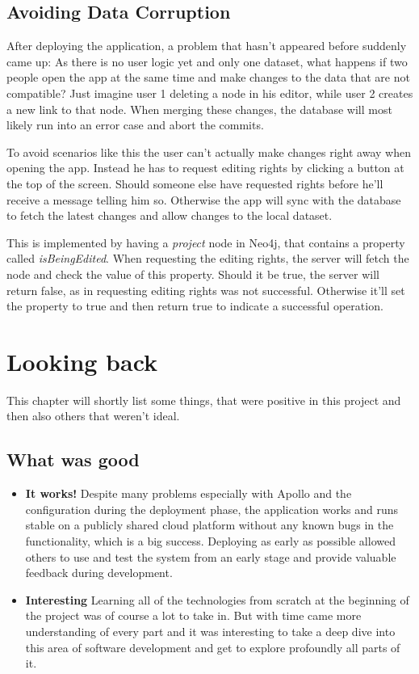 \newpage
\section{Avoiding Data Corruption}
After deploying the application, a problem that hasn't appeared before suddenly came up: As there is no user logic yet and only one dataset, what happens if two people open the app at the same time and make changes to the data that are not compatible? Just imagine user 1 deleting a node in his editor, while user 2 creates a new link to that node. When merging these changes, the database will most likely run into an error case and abort the commits.

To avoid scenarios like this the user can't actually make changes right away when opening the app. Instead he has to request editing rights by clicking a button at the top of the screen. Should someone else have requested rights before he'll receive a message telling him so. Otherwise the app will sync with the database to fetch the latest changes and allow changes to the local dataset.

This is implemented by having a \emph{project} node in Neo4j, that contains a property called \emph{isBeingEdited}. When requesting the editing rights, the server will fetch the node and check the value of this property. Should it be true, the server will return false, as in requesting editing rights was not successful. Otherwise it'll set the property to true and then return true to indicate a successful operation.

\chapter{Looking back}
\label{chap:LB}
This chapter will shortly list some things, that were positive in this project and then also others that weren't ideal.

\section{What was good}
\begin{itemize}
\item \textbf{It works!} Despite many problems especially with Apollo and the configuration during the deployment phase, the application works and runs stable on a publicly shared cloud platform without any known bugs in the functionality, which is a big success. Deploying as early as possible allowed others to use and test the system from an early stage and provide valuable feedback during development.

\item \textbf{Interesting} Learning all of the technologies from scratch at the beginning of the project was of course a lot to take in. But with time came more understanding of every part and it was interesting to take a deep dive into this area of software development and get to explore profoundly all parts of it.
\end{itemize}

